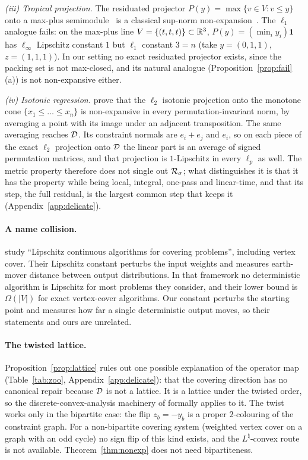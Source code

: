 \emph{(iii) Tropical projection.} The residuated projector $P(y) = \max\{v \in V : v \le y\}$ onto a
max-plus semimodule~\citep{cohen2004} is a classical sup-norm
non-expansion~\citep[Prop.~2]{crandall1980}. The $\ell_1$ analogue fails: on the max-plus line
$V = \{(t,t,t)\} \subset \mathbb{R}^3$, $P(y) = (\min_i y_i)\mathbf{1}$ has $\ell_\infty$ Lipschitz
constant $1$ but $\ell_1$ constant $3 = n$ (take $y = (0,1,1)$, $z = (1,1,1)$). In our setting no
exact residuated projector exists, since the packing set is not max-closed, and its natural
analogue (Proposition~\ref{prop:fail}(a)) is not non-expansive either.

\emph{(iv) Isotonic regression.} \citet{yang2019} prove that the $\ell_2$ isotonic projection onto
the monotone cone $\{x_1 \le \dots \le x_n\}$ is non-expansive in every permutation-invariant norm,
by averaging a point with its image under an adjacent transposition. The same averaging reaches
$\mathcal{D}$. Its constraint normals are $e_i + e_j$ and
$e_i$, so on each piece of the exact $\ell_2$ projection onto $\mathcal{D}$ the linear part is an
average of signed permutation matrices, and that projection is $1$-Lipschitz in every $\ell_p$ as
well. The metric property therefore does not single out $\mathcal{R}_\sigma$; what distinguishes it is
that it has the property while being local, integral, one-pass and linear-time, and that its step,
the full residual, is the largest common step that keeps it (Appendix~\ref{app:delicate}).

\paragraph{A name collision.} \citet{kumabe2025} study ``Lipschitz continuous algorithms for
covering problems'', including vertex cover. Their Lipschitz constant perturbs the input weights
and measures earth-mover distance between output distributions. In that framework no deterministic
algorithm is Lipschitz for most problems they consider, and their lower bound is $\Omega(|V|)$ for
exact vertex-cover algorithms. Our constant perturbs the starting point and measures how far a
single deterministic output moves, so their statements and ours are unrelated.

\paragraph{The twisted lattice.} Proposition~\ref{prop:lattice} rules out one possible explanation
of the operator map (Table~\ref{tab:zoo}, Appendix~\ref{app:delicate}): that the covering direction
has no canonical repair because $\mathcal{D}$ is not a lattice. It is a lattice under the twisted order,
so the discrete-convex-analysis machinery of \citet{sakaue2022,sakaue2023} formally applies to it.
The twist works only in the bipartite case: the flip $z_b = -y_b$ is a proper $2$-colouring of the
constraint graph. For a non-bipartite covering system (weighted vertex cover on a graph with an odd
cycle) no sign flip of this kind exists, and the $L^\natural$-convex route is not available.
Theorem~\ref{thm:nonexp} does not need bipartiteness.

